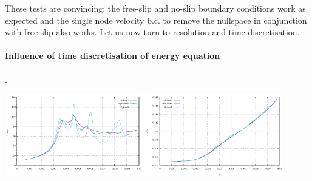 These tests are convincing: the free-slip and no-slip boundary conditions work as expected 
and the single node velocity b.c. to remove the nullspace in conjunction with free-slip also 
works. 
Let us now turn to resolution and time-discretisation. 





\paragraph{Influence of time discretisation of energy equation}.

\begin{center}
\includegraphics[width=6cm]{python_codes/fieldstone_33/results/alpha_study/vrms.pdf}
\includegraphics[width=6cm]{python_codes/fieldstone_33/results/alpha_study/Tavrg.pdf}
\end{center}



